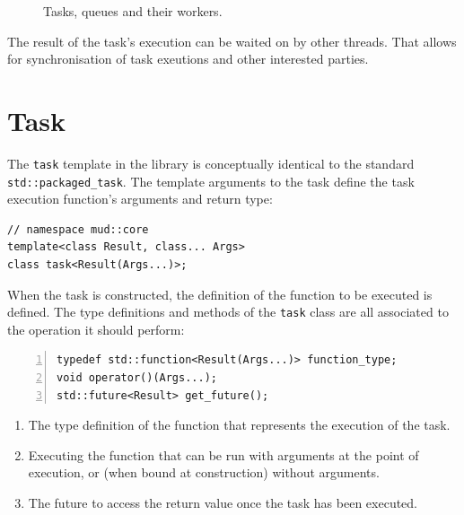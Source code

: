 \documentclass[10pt,a4paper,openany]{mudbook}
\makeatletter
\newcommand{\indextt}[2][]{\texttt{#2}\index{#2@\texttt{#2}#1}}
\newenvironment{enumeratedef}
  {\begin{enumerate}[topsep=0.5em,itemsep=0em,parsep=0em,font=\small]
     \small}
  {\end{enumerate}}
\makeatother
\begin{document}
\begin{figure}[h]
  \centering
  \caption{Tasks, queues and their workers.}
\end{figure}

The result of the task's execution can be waited on by other threads. That
allows for synchronisation of task exeutions and other interested parties.

\section{Task}

The \indextt{task} template in the \MUDLib library is conceptually identical to
 the standard \texttt{std::packaged\_task}. The template arguments to the task
define the task execution function's arguments and return type:

\begin{lstlisting}[style=definition]
// namespace mud::core
template<class Result, class... Args>
class task<Result(Args...)>;
\end{lstlisting}

When the task is constructed, the definition of the function to be executed
is defined. The type definitions and methods of the \texttt{task} class are
all associated to the operation it should perform:

\begin{lstlisting}[style=definition,numbers=left]
typedef std::function<Result(Args...)> function_type;
void operator()(Args...);
std::future<Result> get_future();
\end{lstlisting}
\begin{enumeratedef}
  \item The type definition of the function that represents the execution of
        the task.
  \item Executing the function that can be run with arguments at the point
        of execution, or (when bound at construction) without arguments.
  \item The future to access the return value once the task has been executed.
\end{enumeratedef}
\end{document}
